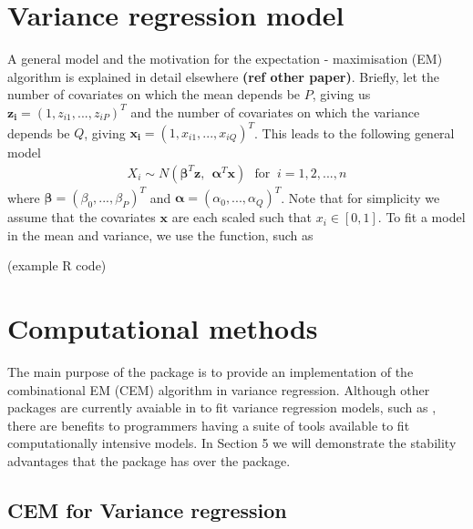 \documentclass[
]{jss}
\begin{document}
\hypertarget{variance-regression-model}{%
\section{Variance regression model}\label{variance-regression-model}}

A general model and the motivation for the expectation - maximisation
(EM) algorithm is explained in detail elsewhere \textbf{(ref other
paper)}. Briefly, let the number of covariates on which the mean depends
be \(P\), giving us \(\mathbf{z_i} =(1, z_{i1}, ..., z_{iP} )^T\) and
the number of covariates on which the variance depends be \(Q\), giving
\(\mathbf{x_i} =\left(1, x_{i1}, ..., x_{iQ} \right)^T\). This leads to
the following general model \begin{align} 
X_i \sim N\left(\bm{\beta}^T \mathbf{z}, ~~ \bm{\alpha}^T \mathbf{x} \right) ~~~ \textrm{for }~ i=1, 2,...,n \label{eq_main}
\end{align} where \(\bm{\beta} =( \beta_0,...,\beta_P)^T\) and
\(\bm{\alpha} = (\alpha_0, ..., \alpha_Q)^T\). Note that for simplicity
we assume that the covariates \(\mathbf{x}\) are each scaled such that
\(x_i \in [0,1]\). To fit a model in the mean and variance, we use the
 function, such as

(example R code)

\hypertarget{computational-methods}{%
\section{Computational methods}\label{computational-methods}}

The main purpose of the  package is to provide an
implementation of the combinational EM (CEM) algorithm in variance
regression. Although other packages are currently avaiable in
 to fit variance regression models, such as ,
there are benefits to programmers having a suite of tools available to
fit computationally intensive models. In Section 5 we will demonstrate
the stability advantages that the  package has over the
 package.

\hypertarget{cem-for-variance-regression}{%
\subsection{CEM for Variance
regression}\label{cem-for-variance-regression}}
\end{document}

